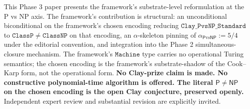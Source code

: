 \documentclass[11pt,a4paper]{article}
\theoremstyle{plain}
\theoremstyle{definition}
\begin{document}
This Phase 3 paper presents the framework's substrate-level
reformulation at the P vs NP axis. The framework's contribution is
structural: an unconditional biconditional on the framework's chosen
encoding reducing $\mathtt{Clay\_PvsNP\_Standard}$ to
$\mathtt{ClassP} \neq \mathtt{ClassNP}$ on that encoding, an
$\alpha$-skeleton pinning of $\alpha_{\mathsf{P}\mathrm{vs}\mathsf{NP}}
:= 5/4$ under the editorial convention, and integration into the
Phase 2 simultaneous-closure mechanism. The framework's
$\mathtt{Machine}$ type carries no operational Turing semantics; the
chosen encoding is the framework's substrate-shadow of the Cook--Karp
form, not the operational form. \textbf{No Clay-prize claim is made.
No constructive polynomial-time algorithm is offered. The literal
$\mathsf{P} \neq \mathsf{NP}$ on the chosen encoding is the open
Clay conjecture, preserved openly.} Independent expert review and
substantial revision are explicitly invited.
\end{document}
